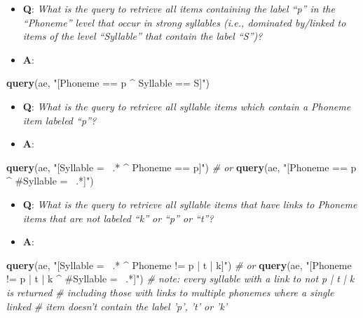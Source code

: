 \documentclass[]{book}
\newenvironment{Shaded}{\begin{snugshade}}{\end{snugshade}}
\newcommand{\CommentTok}[1]{\textcolor[rgb]{0.56,0.35,0.01}{\textit{#1}}}
\newcommand{\KeywordTok}[1]{\textcolor[rgb]{0.13,0.29,0.53}{\textbf{#1}}}
\newcommand{\NormalTok}[1]{#1}
\newcommand{\StringTok}[1]{\textcolor[rgb]{0.31,0.60,0.02}{#1}}
\providecommand{\tightlist}{%
  \setlength{\itemsep}{0pt}\setlength{\parskip}{0pt}}
\begin{document}
\begin{itemize}
\tightlist
\item
  \textbf{Q}: \emph{What is the query to retrieve all items containing the label ``p'' in the ``Phoneme'' level that occur in strong syllables (i.e., dominated by/linked to items of the level ``Syllable'' that contain the label ``S'')?}
\item
  \textbf{A}:
\end{itemize}

\begin{Shaded}
\begin{Highlighting}[]
\KeywordTok{query}\NormalTok{(ae, }\StringTok{"[Phoneme == p ^ Syllable == S]"}\NormalTok{)}
\end{Highlighting}
\end{Shaded}

\begin{itemize}
\tightlist
\item
  \textbf{Q}: \emph{What is the query to retrieve all syllable items which contain a Phoneme item labeled ``p''?}
\item
  \textbf{A}:
\end{itemize}

\begin{Shaded}
\begin{Highlighting}[]
\KeywordTok{query}\NormalTok{(ae, }\StringTok{"[Syllable =~ .* ^ Phoneme == p]"}\NormalTok{) }
\CommentTok{# or }
\KeywordTok{query}\NormalTok{(ae, }\StringTok{"[Phoneme == p ^ #Syllable =~ .*]"}\NormalTok{)}
\end{Highlighting}
\end{Shaded}

\begin{itemize}
\tightlist
\item
  \textbf{Q}: \emph{What is the query to retrieve all syllable items that have links to Phoneme items that are not labeled ``k'' or ``p'' or ``t''?}
\item
  \textbf{A}:
\end{itemize}

\begin{Shaded}
\begin{Highlighting}[]
\KeywordTok{query}\NormalTok{(ae, }\StringTok{"[Syllable =~ .* ^ Phoneme != p | t | k]"}\NormalTok{)}
\CommentTok{# or }
\KeywordTok{query}\NormalTok{(ae, }\StringTok{"[Phoneme != p | t | k ^ #Syllable =~ .*]"}\NormalTok{)}
\CommentTok{# note: every syllable with a link to not p | t | k is returned}
\CommentTok{# including those with links to multiple phonemes where a single linked}
\CommentTok{# item doesn't contain the label 'p', 't' or 'k'}
\end{Highlighting}
\end{Shaded}
\end{document}
